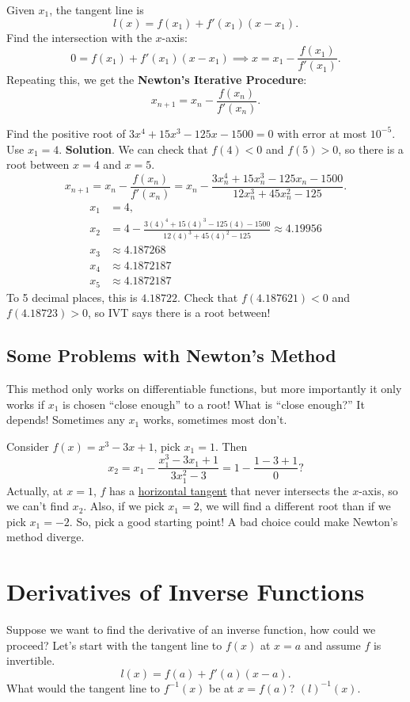 Given $ x_1 $, the tangent line is
\[ l(x)=f(x_1)+f'(x_1)(x-x_1). \]
Find the intersection with the $ x $-axis:
\[ 0=f(x_1)+f'(x_1)(x-x_1)\implies x=x_1-\frac{f(x_1)}{f'(x_1)}. \]
Repeating this, we get the \textbf{Newton's Iterative Procedure}:
\[ x_{n+1}=x_n-\frac{f(x_n)}{f'(x_n)}. \]
\begin{Example}{}{}
    Find the positive root of $ 3x^4+15x^3-125x-1500=0 $ with error at most $ 10^{-5} $. Use $ x_1=4 $.
    \tcblower{}
    \textbf{Solution}. We can check that $ f(4)<0 $ and $ f(5)>0 $, so there is a root between $ x=4 $ and $ x=5 $.
    \[ x_{n+1}=x_n-\frac{f(x_n)}{f'(x_n)}=x_n-\frac{3x_n^4+15x_n^3-125x_n-1500}{12x_n^3+45x_n^2-125}. \]
    \begin{align*}
        x_1 & =4,                                                                      \\
        x_2 & =4-\frac{3(4)^4+15(4)^3-125(4)-1500}{12(4)^3+45(4)^2-125}\approx 4.19956 \\
        x_3 & \approx 4.187268                                                         \\
        x_4 & \approx 4.1872187                                                        \\
        x_5 & \approx 4.1872187
    \end{align*}
    To 5 decimal places, this is $ 4.18722 $. Check that $ f(4.187621)<0 $ and $ f(4.18723)>0 $, so IVT
    says there is a root between!
\end{Example}
\subsection*{Some Problems with Newton's Method}
This method only works on differentiable functions, but more importantly it only works
if $ x_1 $ is chosen ``close enough'' to a root! What is ``close enough?'' It depends!
Sometimes any $ x_1 $ works, sometimes most don't.

\begin{Example}{}{}
    Consider $ f(x)=x^3-3x+1 $, pick $ x_1=1 $. Then
    \[ x_2=x_1-\frac{x_1^3-3x_1+1}{3x_1^2-3}=1-\frac{1-3+1}{0}? \]
    Actually, at $ x=1 $, $ f $ has a \underline{horizontal tangent} that never intersects the
    $ x $-axis, so we can't find $ x_2 $. Also, if we pick $ x_1=2 $, we will find a different root
    than if we pick $ x_1=-2 $. So, pick a good starting point! A bad choice could make Newton's method diverge.
\end{Example}
\setcounter{section}{9}
\section{Derivatives of Inverse Functions} %
Suppose we want to find the derivative of an inverse function, how could we proceed? Let's
start with the tangent line to $ f(x) $ at $ x=a $ and assume $ f $ is invertible.
\[ l(x)=f(a)+f'(a)(x-a). \]
What would the tangent line to $ f^{-1}(x) $ be at $ x=f(a) $? $ (l)^{-1}(x) $.

